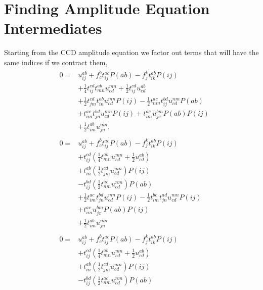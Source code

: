 \documentclass[
    a4paper, aps, twocolumn, floatfix, superscriptaddress,
    nofootinbib]{revtex4-1}
\newcommand{\1}{\mathds{1}}
\begin{document}
\section{Finding Amplitude Equation Intermediates}
    Starting from the CCD amplitude equation we factor out terms that will have the same
    indices if we contract them,
    \begin{align}
        &\begin{aligned}
        0 =& u^{ab}_{ij} + f^b_c t^{ac}_{ij}P(ab) - f^k_jt^{ab}_{ik}P(ij) \\
          &+ \frac{1}{4}t^{cd}_{ij} t^{ab}_{mn} u^{mn}_{cd} + \frac{1}{2}t^{cd}_{ij} u^{ab}_{cd} \\
          &+ \frac{1}{2}t^{cd}_{jm} t^{ab}_{in} u^{mn}_{cd} P(ij) - \frac{1}{2}t^{ac}_{nm} t^{bd}_{ij} u^{nm}_{cd} P(ab) \\
          &+ t^{ac}_{im} t^{bd}_{jn} u^{mn}_{cd} P(ij) + t^{ac}_{im} u^{bm}_{jc} P(ab) P(ij) \\
          &+ \frac{1}{2}t^{ab}_{im} u^{mn}_{jn},
        \end{aligned}\\
        &\begin{aligned}
        0 =& u^{ab}_{ij} + f^b_c t^{ac}_{ij}P(ab) - f^k_jt^{ab}_{ik}P(ij) \\
          &+ t^{cd}_{ij} \left(\frac{1}{4}t^{ab}_{mn} u^{mn}_{cd} + \frac{1}{2} u^{ab}_{cd} \right) \\
          &+  t^{ab}_{in} \left(\frac{1}{2} t^{cd}_{jm} u^{mn}_{cd}\right) P(ij) \\
          &- t^{bd}_{ij} \left(\frac{1}{2}t^{ac}_{nm}  u^{nm}_{cd}\right) P(ab) \\
          &+ \frac{1}{2}t^{ac}_{im} t^{bd}_{jn} u^{mn}_{cd} P(ij) - \frac{1}{2}t^{bc}_{im} t^{ad}_{jn} u^{mn}_{cd} P(ij)\\
          &+ t^{ac}_{im} u^{bm}_{jc} P(ab) P(ij) \\
          &+ \frac{1}{2}t^{ab}_{im} u^{mn}_{jn}
        \end{aligned} \\
        &\begin{aligned}
        0 =& u^{ab}_{ij} + f^b_c t^{ac}_{ij}P(ab) - f^k_jt^{ab}_{ik}P(ij) \\
          &+ t^{cd}_{ij} \left(\frac{1}{4}t^{ab}_{mn} u^{mn}_{cd} + \frac{1}{2} u^{ab}_{cd} \right) \\
          &+  t^{ab}_{in} \left(\frac{1}{2} t^{cd}_{jm} u^{mn}_{cd}\right) P(ij) \\
          &- t^{bd}_{ij} \left(\frac{1}{2}t^{ac}_{nm}  u^{nm}_{cd}\right) P(ab) \\

\end{aligned}
\end{align}
\end{document}
